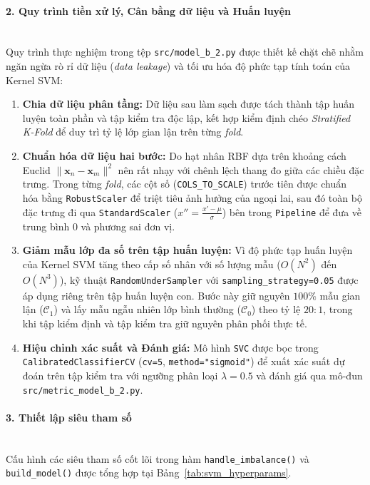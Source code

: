 \paragraph{2. Quy trình tiền xử lý, Cân bằng dữ liệu và Huấn luyện}\mbox{}\\
Quy trình thực nghiệm trong tệp \texttt{src/model\_b\_2.py} được thiết kế chặt chẽ nhằm ngăn ngừa rò rỉ dữ liệu (\textit{data leakage}) và tối ưu hóa độ phức tạp tính toán của Kernel SVM:
\begin{enumerate}
    \item \textbf{Chia dữ liệu phân tầng:} Dữ liệu sau làm sạch được tách thành tập huấn luyện toàn phần và tập kiểm tra độc lập, kết hợp kiểm định chéo \textit{Stratified K-Fold} để duy trì tỷ lệ lớp gian lận trên từng \textit{fold}.
    \item \textbf{Chuẩn hóa dữ liệu hai bước:} Do hạt nhân RBF dựa trên khoảng cách Euclid $\|\mathbf{x}_n - \mathbf{x}_m\|^2$ nên rất nhạy với chênh lệch thang đo giữa các chiều đặc trưng. Trong từng \textit{fold}, các cột số (\texttt{COLS\_TO\_SCALE}) trước tiên được chuẩn hóa bằng \texttt{RobustScaler} để triệt tiêu ảnh hưởng của ngoại lai, sau đó toàn bộ đặc trưng đi qua \texttt{StandardScaler} ($x'' = \frac{x' - \mu}{\sigma}$) bên trong \texttt{Pipeline} để đưa về trung bình $0$ và phương sai đơn vị.
    \item \textbf{Giảm mẫu lớp đa số trên tập huấn luyện:} Vì độ phức tạp huấn luyện của Kernel SVM tăng theo cấp số nhân với số lượng mẫu ($O(N^2)$ đến $O(N^3)$), kỹ thuật \texttt{RandomUnderSampler} với \texttt{sampling\_strategy=0.05} được áp dụng riêng trên tập huấn luyện con. Bước này giữ nguyên $100\%$ mẫu gian lận ($\mathcal{C}_1$) và lấy mẫu ngẫu nhiên lớp bình thường ($\mathcal{C}_0$) theo tỷ lệ $20:1$, trong khi tập kiểm định và tập kiểm tra giữ nguyên phân phối thực tế.
    \item \textbf{Hiệu chỉnh xác suất và Đánh giá:} Mô hình \texttt{SVC} được bọc trong \texttt{CalibratedClassifierCV} (\texttt{cv=5}, \texttt{method="sigmoid"}) để xuất xác suất dự đoán trên tập kiểm tra với ngưỡng phân loại $\lambda = 0.5$ và đánh giá qua mô-đun \texttt{src/metric\_model\_b\_2.py}.
\end{enumerate}

\paragraph{3. Thiết lập siêu tham số}\mbox{}\\
Cấu hình các siêu tham số cốt lõi trong hàm \texttt{handle\_imbalance()} và \texttt{build\_model()} được tổng hợp tại Bảng~\ref{tab:svm_hyperparams}.

